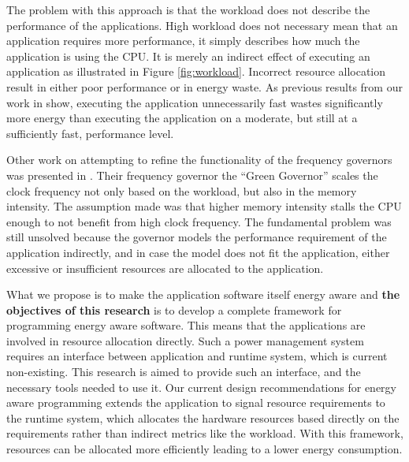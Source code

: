 \documentclass{article}
\begin{document}
The problem with this approach is that the workload does not describe the performance of the applications.
High workload does not necessary mean that an application requires more performance, it simply describes how much the application is using the CPU.
It is merely an indirect effect of executing an application as illustrated in Figure \ref{fig:workload}.
Incorrect resource allocation result in either poor performance or in energy waste.
As previous results from our work in \cite{HolmbackaHipeac, HolmbackaDasip} show, executing the application unnecessarily fast wastes significantly more energy than executing the application on a moderate, but still at a sufficiently fast, performance level.\smallskip

Other work on attempting to refine the functionality of the frequency governors was presented in \cite{Spiliopoulos:11}.
Their frequency governor the ``Green Governor'' scales the clock frequency not only based on the workload, but also in the memory intensity.
The assumption made was that higher memory intensity stalls the CPU enough to not benefit from high clock frequency.
The fundamental problem was still unsolved because the governor models the performance requirement of the application indirectly,
and in case the model does not fit the application, either excessive or insufficient resources are allocated to the application.\smallskip

What we propose is to make the application software itself energy aware and \textbf{the objectives of this research} is to develop a complete framework for programming energy aware software.
This means that the applications are involved in resource allocation directly.
Such a power management system requires an interface between application and runtime system, which is current non-existing.
This research is aimed to provide such an interface, and the necessary tools needed to use it.
Our current design recommendations for energy aware programming extends the application to signal resource requirements to the runtime system, which allocates the hardware resources based directly on the requirements rather than indirect metrics like the workload.
With this framework, resources can be allocated more efficiently leading to a lower energy consumption.
\end{document}
